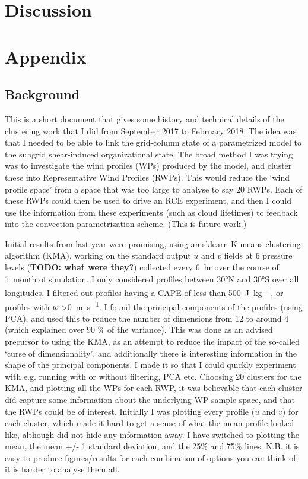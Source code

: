 \documentclass{article}
\newcommand\todo[1]{\textbf{TODO: #1}}
\begin{document}
\section{Discussion}

\newpage
\section*{Appendix}

\subsection*{Background}

This is a short document that gives some history and technical details of the clustering work that I did from September 2017 to February 2018. The idea was that I needed to be able to link the grid-column state of a parametrized model to the subgrid shear-induced organizational state. The broad method I was trying was to investigate the wind profiles (WPs) produced by the model, and cluster these into Representative Wind Profiles (RWPs). This would reduce the `wind profile space' from a space that was too large to analyse to say 20 RWPs. Each of these RWPs could then be used to drive an RCE experiment, and then I could use the information from these experiments (such as cloud lifetimes) to feedback into the convection parametrization scheme. (This is future work.)

Initial results from last year were promising, using an sklearn K-means clustering algorithm (KMA), working on the standard output $u$ and $v$ fields at 6 pressure levels (\todo{what were they?}) collected every \SI{6}{hr} over the course of \SI{1}{month} of simulation. I only considered profiles between \ang{30}N and \ang{30}S over all longitudes. I filtered out profiles having a CAPE of less than \SI{500}{J.kg^{-1}}, or profiles with $w$ \textgreater  \SI{0}{m.s^{-1}}. I found the principal components of the profiles (using PCA), and used this to reduce the number of dimensions from 12 to around 4 (which explained over 90 \% of the variance). This was done as an advised precursor to using the KMA, as an attempt to reduce the impact of the so-called `curse of dimensionality', and additionally there is interesting information in the shape of the principal components. I made it so that I could quickly experiment with e.g. running with or without filtering, PCA etc. Choosing 20 clusters for the KMA, and plotting all the WPs for each RWP, it was believable that each cluster did capture some information about the underlying WP sample space, and that the RWPs could be of interest. Initially I was plotting every profile ($u$ and $v$) for each cluster, which made it hard to get a sense of what the mean profile looked like, although did not hide any information away. I have switched to plotting the mean, the mean +/- 1 standard deviation, and the 25\% and 75\% lines. N.B. it is easy to produce figures/results for each combination of options you can think of; it is harder to analyse them all. 
\end{document}
